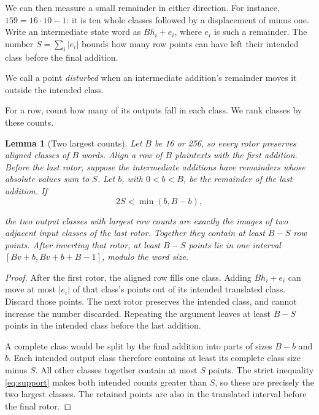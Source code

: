 \documentclass[11pt]{article}
\newtheorem{lemma}[theorem]{Lemma}
\begin{document}
We can then measure a small remainder in either direction.
For instance, \(159=16\cdot10-1\): it is ten whole classes followed
by a displacement of minus one. Write an intermediate state word
as \(Bh_i+e_i\), where \(e_i\) is such a remainder.
The number \(S=\sum_i|e_i|\) bounds how many row points can have
left their intended class before the final addition.

We call a point \emph{disturbed} when an intermediate addition's
remainder moves it outside the intended class.

For a row, count how many of its outputs fall in each class. We rank
classes by these counts.

\begin{lemma}[Two largest counts]\label{lem:block}
Let \(B\) be 16 or 256, so every rotor preserves aligned classes of
\(B\) words. Align a row of \(B\) plaintexts with the first addition. Before the
last rotor, suppose the intermediate additions have remainders
whose absolute values sum to \(S\). Let \(b\), with \(0<b<B\), be
the remainder of the last addition. If
\begin{equation}
                      2S<\min(b,B-b),\label{eq:support} 
\end{equation}

the two output classes with largest row counts are exactly the images of two adjacent
input classes of the last rotor. Together they contain at least
\(B-S\) row points. After inverting that rotor, at least \(B-S\)
points lie in one interval \([Bv+b,Bv+b+B-1]\), modulo
the word size.
\end{lemma}
\begin{proof}
After the first rotor, the aligned row fills one class. Adding
\(Bh_i+e_i\) can move at most \(|e_i|\) of that class's points out
of its intended translated class. Discard those points. The next
rotor preserves the intended class, and cannot increase the number
discarded. Repeating the argument leaves at least \(B-S\) points in the intended
class before the last addition.

A complete class would be split by the final addition into parts
of sizes \(B-b\) and \(b\). Each intended output class therefore
contains at least its complete class size minus \(S\). All other
classes together contain at most \(S\) points. The strict inequality
\eqref{eq:support} makes both intended counts greater than \(S\),
so these are precisely the two largest classes. The retained points
are also in the translated interval before the final rotor.
\end{proof}
\end{document}
